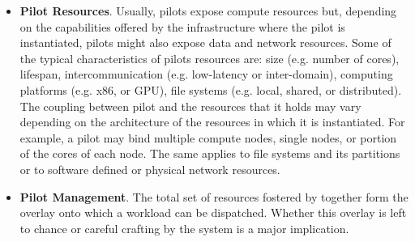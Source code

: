 \documentclass{sig-alternate}
\begin{document}
\begin{itemize}

\item \textbf{Pilot Resources}. Usually, pilots expose compute resources but,
  depending on the capabilities offered by the infrastructure where the pilot
  is instantiated, pilots might also expose data and network resources. Some of
  the typical characteristics of pilots resources are: size (e.g. number of
  cores), lifespan, intercommunication (e.g. low-latency or inter-domain),
  computing platforms (e.g. x86, or GPU), file systems (e.g. local, shared, or
  distributed). The coupling between pilot and the resources that it holds may
  vary depending on the architecture of the resources in which it is
  instantiated. For example, a pilot may bind multiple compute nodes, single
  nodes, or portion of the cores of each node. The same applies to file systems
  and its partitions or to software defined or physical network resources.




\item \textbf{Pilot Management}. The total set of resources fostered by
  \pilots together form the overlay onto which a workload can be dispatched.
  Whether this overlay is left to chance or careful crafting by the \pilot
  system is a major implication.



\end{itemize}
\end{document}
